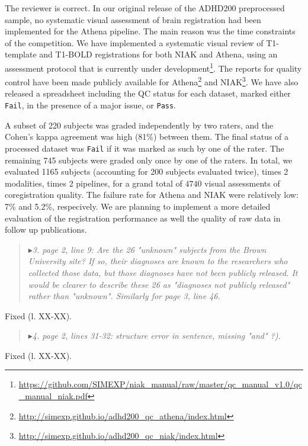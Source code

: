 \documentclass[authoryear,3p]{elsarticle}
\begin{document}
The reviewer is correct. In our original release of the ADHD200 preprocessed sample, no systematic visual assessment of brain registration had been implemented for the Athena pipeline. The main reason was the time constraints of the competition. We have implemented a systematic visual review of T1-template and T1-BOLD registrations for both NIAK and Athena, using an assessment protocol that is currently under development\footnote{\url{https://github.com/SIMEXP/niak_manual/raw/master/qc_manual_v1.0/qc_manual_niak.pdf}}. The reports for quality control have been made publicly available for Athena\footnote{\url{http://simexp.github.io/adhd200_qc_athena/index.html}} and NIAK\footnote{\url{http://simexp.github.io/adhd200_qc_niak/index.html}}. We have also released a spreadsheet including the QC status for each dataset, marked either \texttt{Fail}, in the presence of a major issue, or \texttt{Pass}. 
\par 
A subset of 220 subjects was graded independently by two raters, and the Cohen's kappa agreement was high (81\%) between them. The final status of a processed dataset was \texttt{Fail} if it was marked as such by one of the rater. The remaining 745 subjects were graded only once by one of the raters. In total, we evaluated 1165 subjects (accounting for 200 subjects evaluated twice), times 2 modalities, times 2 pipelines, for a grand total of $4740$ visual assessments of coregistration quality. The failure rate for Athena and NIAK were relatively low: 7\% and 5.2\%, respecively. We are planning to implement a more detailed evaluation of the registration performance as well the quality of raw data in follow up publications. 

\begin{quote}
$\blacktriangleright$\emph{3. page 2, line 9: Are the 26 "unknown" subjects from the Brown University site? If so, their diagnoses are known to the researchers who collected those data, but those diagnoses have not been publicly released. It would be clearer to describe these 26 as "diagnoses not publicly released" rather than "unknown". Similarly for page 3, line 46.}
\end{quote}

Fixed (l. XX-XX). 

\begin{quote}
$\blacktriangleright$\emph{4. page 2, lines 31-32: structure error in sentence, missing "and" ?). 
}
\end{quote}

Fixed (l. XX-XX).
\end{document}
